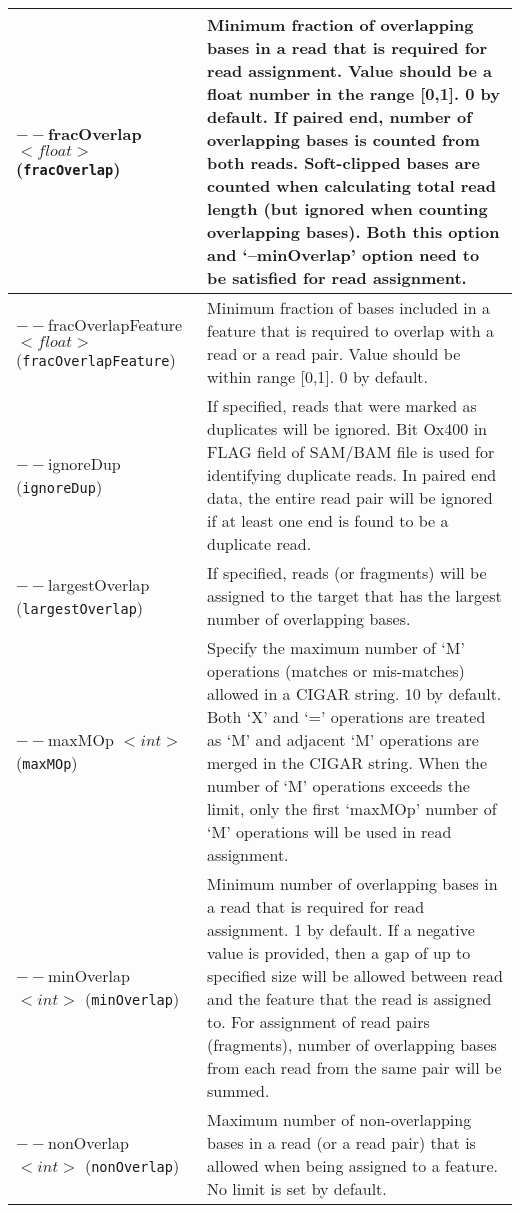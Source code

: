 \documentclass[12pt]{report}
\newcommand{\code}[1]{{\small\texttt{#1}}}
\begin{document}
\begin{longtable}{|p{5cm}|p{11cm}|}
\hline
$--$fracOverlap $<float>$ \newline (\code{fracOverlap}) & Minimum fraction of overlapping bases in a read that is required for read assignment. Value should be a float number in the range [0,1]. 0 by default. If paired end, number of overlapping bases is counted from both reads. Soft-clipped bases are counted when calculating total read length (but ignored when counting overlapping bases). Both this option and `--minOverlap' option need to be satisfied for read assignment. \\
\hline
$--$fracOverlapFeature $<float>$ \newline (\code{fracOverlapFeature}) & Minimum fraction of bases included in a feature that is required to overlap with a read or a read pair. Value should be within range [0,1]. 0 by default. \\
\hline
$--$ignoreDup \newline (\code{ignoreDup}) & If specified, reads that were marked as duplicates will be ignored. Bit Ox400 in FLAG field of SAM/BAM file is used for identifying duplicate reads. In paired end data, the entire read pair will be ignored if at least one end is found to be a duplicate read.\\
\hline
$--$largestOverlap \newline (\code{largestOverlap}) & If specified, reads (or fragments) will be assigned to the target that has the largest number of overlapping bases.\\
\hline
$--$maxMOp $<int>$ \newline (\code{maxMOp}) & Specify the maximum number of `M' operations (matches or mis-matches) allowed in a CIGAR string. 10 by default. Both `X' and `=' operations are treated as `M' and adjacent `M' operations are merged in the CIGAR string. When the number of `M' operations exceeds the limit, only the first `maxMOp' number of `M' operations will be used in read assignment.\\
\hline
$--$minOverlap $<int>$ \newline (\code{minOverlap}) & Minimum number of overlapping bases in a read that is required for read assignment. 1 by default. If a negative value is provided, then a gap of up to specified size will be allowed between read and the feature that the read is assigned to. For assignment of read pairs (fragments), number of overlapping bases from each read from the same pair will be summed. \\
\hline
$--$nonOverlap $<int>$ \newline (\code{nonOverlap}) & Maximum number of non-overlapping bases in a read (or a read pair) that is allowed when being assigned to a feature. No limit is set by default. \\

\end{longtable}
\end{document}
